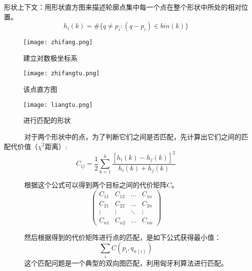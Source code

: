 \documentclass[notheorems,mathserif,table,compress]{beamer}  %
\begin{document}
\begin{frame}
形状上下文：用形状直方图来描述轮廓点集中每一个点在整个形状中所处的相对位置。
\begin{displaymath}
h_{i}(k)=\#\{q \neq p_{i} : (q-p_{i}) \in bin(k)\}
\end{displaymath}
   \begin{figure}[!ht]
    \begin{minipage}{0.4\textwidth}
    \centering
    \texttt{[image: zhifang.png]}
    \caption{建立对数极坐标系}
    \end{minipage}
    \begin{minipage}{0.4\textwidth}
    \centering
    \texttt{[image: zhifangtu.png]}
    \caption{该点直方图}
    \end{minipage}
   \end{figure}
\end{frame}

\begin{frame}
   \begin{figure}[!ht]
    \centering
   \texttt{[image: liangtu.png]}
    \caption{进行匹配的形状}
   \end{figure}
~~~~~~对于两个形状中的点，为了判断它们之间是否匹配，先计算出它们之间的匹配代价值（$\chi^{2}$距离）:
\begin{displaymath}
C_{ij}=\frac{1}{2}\sum_{k=1}^{k}\frac{[h_{i}(k)-h_{j}(k)]^{2}}{h_{i}(k)+h_{j}(k)}
\end{displaymath}
\end{frame}

\begin{frame}
~~~~~~根据这个公式可以得到两个目标之间的代价矩阵$C$。
\begin{displaymath}
\left( \begin{array}{cccc}
C_{11} & C_{12} & \ldots & C_{1n} \\
C_{21} & C_{22} & \ldots & C_{2n} \\
\vdots & \vdots & \ddots & \vdots \\
C_{n1} & C_{n2} & \ldots & C_{nn}
\end{array} \right)
\end{displaymath}

~~~~~~然后根据得到的代价矩阵进行点的匹配，是如下公式获得最小值：
\begin{displaymath}
\sum_{i}C(p_{i},q_{\pi(i)})
\end{displaymath}
~~~~~~这个匹配问题是一个典型的双向图匹配，利用{\color{blue}匈牙利算法}进行匹配。

\end{frame}
\end{document}
